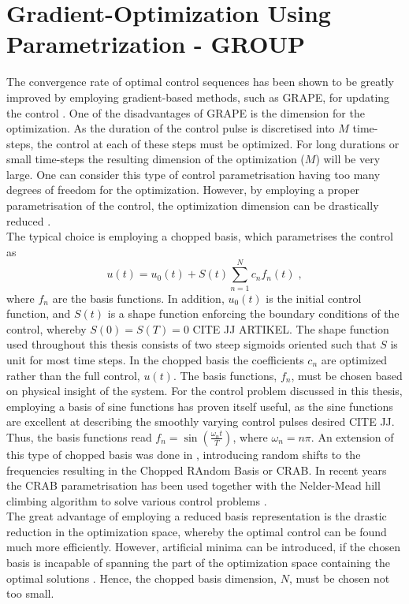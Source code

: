 \section{Gradient-Optimization Using Parametrization - GROUP} \label{sec:GROUP}
The convergence rate of optimal control sequences has been shown to be greatly improved by employing gradient-based methods, such as GRAPE, for updating the control \cite{Jager2014}.
One of the disadvantages of GRAPE is the dimension for the optimization. As the duration of the control pulse is discretised into $M$ time-steps, the control at each of these steps must be optimized. For long durations or small time-steps the resulting dimension of the optimization ($M$) will be very large. One can consider this type of control parametrisation having too many degrees of freedom for the optimization. 
However, by employing a proper parametrisation of the control, the optimization dimension can be drastically reduced \cite{Winckel2008}.\\
The typical choice is employing a chopped basis, which parametrises the control as
\begin{equation}
	u(t) = u_0 (t) + S(t) \sum_{n=1}^{N} c_n f_n (t) \; , \label{eq:controlParametrization}
\end{equation}   
where $f_n$ are the basis functions. In addition, $u_0 (t)$ is the initial control function, and $S (t)$ is a shape function enforcing the boundary conditions of the control, whereby $S(0) = S(T) = 0$ CITE JJ ARTIKEL. The shape function used throughout this thesis consists of two steep sigmoids oriented such that $S$ is unit for most time steps. In the chopped basis the coefficients $c_n$ are optimized rather than the full control, $u(t)$. The basis functions, $f_n$, must be chosen based on physical insight of the system. For the control problem discussed in this thesis, employing a basis of sine functions has proven itself useful, as the sine functions are excellent at describing the smoothly varying control pulses desired CITE JJ. Thus, the basis functions read $f_n = \sin \left( \frac{\omega_n t}{T} \right)$, where $\omega_n = n \pi$.
An extension of this type of chopped basis was done in \cite{Doria2011,Caneva2011}, introducing random shifts to the frequencies resulting in the Chopped RAndom Basis or \textsc{CRAB}. In recent years the \textsc{CRAB} parametrisation has been used together with the Nelder-Mead hill climbing algorithm to solve various control problems \cite{Doria2011,Caneva2011,FrankBloch,Lloyd2014}.\\
The great advantage of employing a reduced basis representation is the drastic reduction in the optimization space, whereby the optimal control can be found much more efficiently. However, artificial minima can be introduced, if the chosen basis is incapable of spanning the part of the optimization space containing the optimal solutions \cite{Rach2015}. Hence, the chopped basis dimension, $N$, must be chosen not too small.\\


